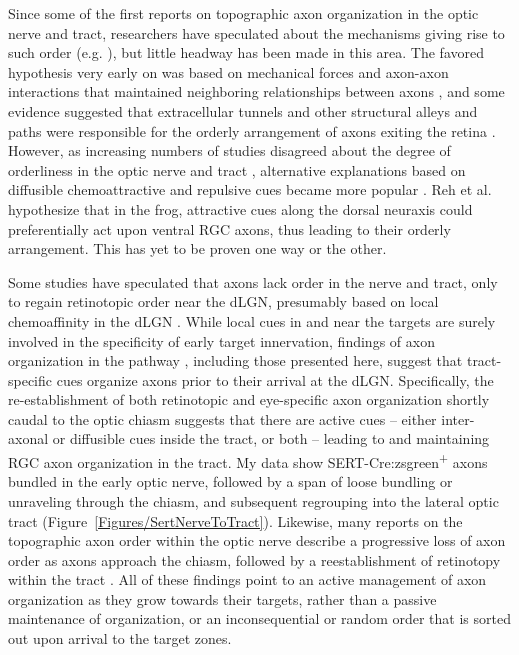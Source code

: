 Since some of the first reports on topographic axon organization in the optic nerve and tract, researchers have speculated about the mechanisms giving rise to such order (e.g. ), but little headway has been made in this area.
The favored hypothesis very early on was based on mechanical forces and axon-axon interactions that maintained neighboring relationships between axons \cite{cook1977multiple}, and some evidence suggested that extracellular tunnels and other structural alleys and paths were responsible for the orderly arrangement of axons exiting the retina \cite{silver1980mechanism}.
However, as increasing numbers of studies disagreed about the degree of orderliness in the optic nerve and tract \cite{martin1983role}, alternative explanations based on diffusible chemoattractive and repulsive cues became more popular \cite{reh1983organization}.
Reh et al.  hypothesize that in the frog, attractive cues along the dorsal neuraxis could preferentially act upon ventral RGC axons, thus leading to their orderly arrangement.
This has yet to be proven one way or the other.

Some studies have speculated that axons lack order in the nerve and tract, only to regain retinotopic order near the dLGN, presumably based on local chemoaffinity in the dLGN \cite{horton1979non}.
While local cues in and near the targets are surely involved in the specificity of early target innervation, findings of axon organization in the pathway \cite{martin1983role,chan1999changes,chan1994changes,plas2005pretarget,reese1993reestablishment}, including those presented here, suggest that tract-specific cues organize axons prior to their arrival at the dLGN.
Specifically, the re-establishment of both retinotopic and eye-specific axon organization shortly caudal to the optic chiasm suggests that there are active cues -- either inter-axonal or diffusible cues inside the tract, or both -- leading to and maintaining RGC axon organization in the tract.
My data show SERT-Cre:zsgreen\textsuperscript{+} axons bundled in the early optic nerve, followed by a span of loose bundling or unraveling through the chiasm, and subsequent regrouping into the lateral optic tract (Figure~\ref{Figures/SertNerveToTract}).
Likewise, many reports on the topographic axon order within the optic nerve describe a progressive loss of axon order as axons approach the chiasm, followed by a reestablishment of retinotopy within the tract \cite{chan1999changes,plas2005pretarget,chan1994changes,simon1991relationship,reese1993reestablishment,horton1979non,naito1986course,naito1994retinogeniculate,colello1998changing,montgomery1998organization,ehrlich1984course}. 
All of these findings point to an active management of axon organization as they grow towards their targets, rather than a passive maintenance of organization, or an inconsequential or random order that is sorted out upon arrival to the target zones.

